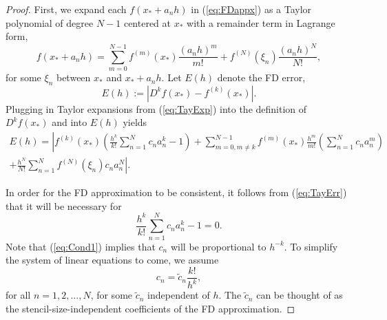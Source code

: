 \documentclass[12pt]{article}
\newcommand{\xstar}{x_*}
\newcommand{\FD}{D}
\begin{document}
\begin{proof}
First, we expand each $f(\xstar+a_nh)$ in (\ref{eq:FDappx}) as a Taylor polynomial of degree $N-1$ centered at $\xstar$ with a remainder term in Lagrange form,
\begin{equation}\label{eq:TayExp}
	f(\xstar+a_nh) = 
	\sum_{m=0}^{N-1} f^{(m)}(\xstar)\frac{(a_nh)^m}{m!} + f^{(N)}(\xi_n)\frac{(a_n h)^{N}}{N!},
\end{equation}
for some $\xi_n$ between $\xstar$ and $\xstar+a_nh$.
Let $E(h)$ denote the FD error,
\[
	E(h) := \left| \FD^k f(\xstar) - f^{(k)}(\xstar) \right|.
\]
Plugging in Taylor expansions from (\ref{eq:TayExp}) into the definition of $\FD^k f(\xstar)$ and into $E(h)$ yields
\begin{equation}\label{eq:TayErr}
\begin{split}
	E(h) = \left| f^{(k)}(\xstar) 
	\left( \frac{h^k}{k!} \sum_{n=1}^N c_na_n^k -1 \right) \right.
        + \sum_{m=0,m\neq k}^{N-1} f^{(m)}(\xstar) \frac{h^m}{m!}\left(\sum_{n=1}^N c_n a_n^m\right) 
        \hspace{5em}  & \\
        \left.
        + \frac{h^{N}}{N!}\sum_{n=1}^N f^{(N)}(\xi_n)c_n a_n^{N}
        \right|.
\end{split}
\end{equation}

In order for the FD approximation to be consistent, it follows from (\ref{eq:TayErr}) that it will be necessary for
\begin{equation}\label{eq:Cond1}
	\frac{h^k}{k!} \sum_{n=1}^N c_na_n^k -1 = 0.
\end{equation}
Note that (\ref{eq:Cond1}) implies that $c_n$ will be proportional to $h^{-k}$.
To simplify the system of linear equations to come, we assume 
\begin{equation}\label{eq:tilde c}
	c_n = \tilde c_n \frac{k!}{h^k},
\end{equation}
for all $n=1,2,...,N$, for some $\tilde c_n$ independent of $h$.
The $\tilde c_n$ can be thought of as the stencil-size-independent coefficients of the FD approximation.


\end{proof}
\end{document}
